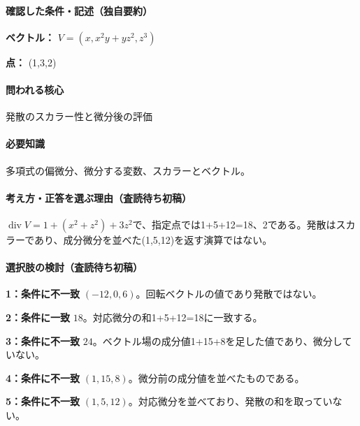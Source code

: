 \paragraph{確認した条件・記述（独自要約）}\mbox{}\par

\noindent\textbf{ベクトル：} \(V=(x,x^2y+yz^2,z^3)\)\par

\noindent\textbf{点：} (1,3,2)\par

\paragraph{問われる核心} 発散のスカラー性と微分後の評価

\paragraph{必要知識} 多項式の偏微分、微分する変数、スカラーとベクトル。

\paragraph{考え方・正答を選ぶ理由（査読待ち初稿）} \(\operatorname{div}V=1+(x^2+z^2)+3z^2\)で、指定点では1+5+12=\allowbreak{}18、2である。発散はスカラーであり、成分微分を並べた(1,5,12)を返す演算ではない。

\paragraph{選択肢の検討（査読待ち初稿）}\mbox{}\par

\noindent\textbf{1：条件に不一致} \((-12,0,6)\)。回転ベクトルの値であり発散ではない。\par

\noindent\textbf{2：条件に一致} \(18\)。対応微分の和1+5+12=\allowbreak{}18に一致する。\par

\noindent\textbf{3：条件に不一致} \(24\)。ベクトル場の成分値1+15+8を足した値であり、微分していない。\par

\noindent\textbf{4：条件に不一致} \((1,15,8)\)。微分前の成分値を並べたものである。\par

\noindent\textbf{5：条件に不一致} \((1,5,12)\)。対応微分を並べており、発散の和を取っていない。\par

